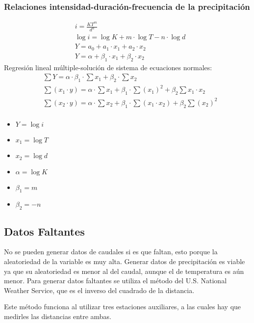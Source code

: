 \subsubsection{Relaciones intensidad-duración-frecuencia de la precipitación}
\begin{align}
    &i = \frac{KT^m}{d^n}\\
    &\log{i} =\log{K} + m\cdot\log{T} - n\cdot\log{d}\\
    &Y = a_0 +a_1 \cdot x_1 + a_2 \cdot x_2\\
    &Y = \alpha +\beta_1 \cdot x_1 + \beta_2 \cdot x_2
\end{align}
Regresión lineal múltiple-solución de sistema de ecuaciones normales:
\begin{align}
    &\sum Y =\alpha\cdot \beta_1 \cdot \sum x_1 + \beta_2 \cdot \sum x_2\\
    &\sum\left(x_1 \cdot y\right) = \alpha\cdot\sum x_1 + \beta_1 \cdot \sum \left(x_1\right)^2 + \beta_2\sum x_1 \cdot x_2\\
    &\sum\left(x_2 \cdot y\right) = \alpha\cdot\sum x_2 + \beta_1 \cdot \sum \left(x_1\cdot x_2\right) + \beta_2\sum \left(x_2\right)^2 \\
\end{align}
\begin{notation}
    \begin{itemize}
        \item $Y=\log{i}$
        \item $x_1=\log{T}$
        \item $x_2=\log{d}$
        \item $\alpha=\log{K}$
        \item $\beta_1=m$
        \item $\beta_2=-n$
    \end{itemize}
\end{notation}
\subsection{Datos Faltantes}
No se pueden generar datos de caudales si es que faltan, esto porque la aleatoriedad de la variable es muy alta. Generar datos de precipitación es viable ya que su aleatoriedad es menor al del caudal, aunque el de temperatura es aún menor. Para generar datos faltantes se utiliza el método del U.S. National Weather Service, que es el inverso del cuadrado de la distancia.

Este método funciona al utilizar tres estaciones auxiliares, a las cuales hay que medirles las distancias entre ambas.

